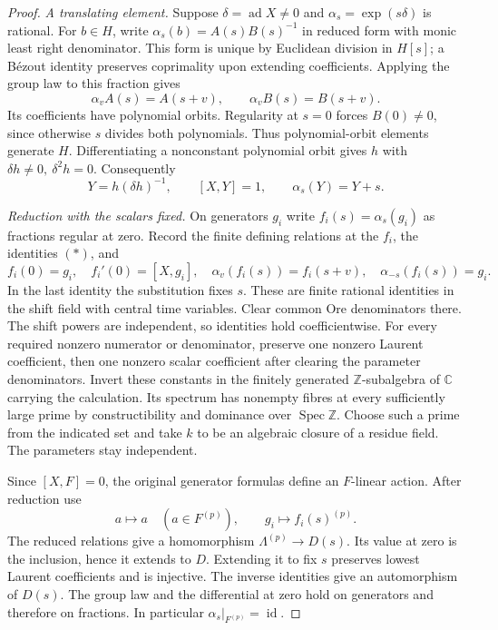 \documentclass[11pt,a4paper]{article}
\theoremstyle{definition}
\begin{document}
\begin{proof}
\emph{A translating element.}
Suppose \(\delta=\operatorname{ad}X\ne0\) and
\(\alpha_s=\exp(s\delta)\) is rational. For \(b\in H\), write
\(\alpha_s(b)=A(s)B(s)^{-1}\) in reduced form with monic least right
denominator. This form is unique by Euclidean division in \(H[s]\);
a Bézout identity preserves coprimality upon extending coefficients.
Applying the group law to this fraction gives
\[
 \alpha_v A(s)=A(s+v),\qquad \alpha_v B(s)=B(s+v).
\]
Its coefficients have polynomial orbits. Regularity at \(s=0\)
forces \(B(0)\ne0\), since otherwise \(s\) divides both polynomials.
Thus polynomial-orbit elements generate \(H\). Differentiating a
nonconstant polynomial orbit gives \(h\) with
\(\delta h\ne0,\ \delta^2h=0\). Consequently
\[
 Y=h(\delta h)^{-1},\qquad [X,Y]=1,\qquad \alpha_s(Y)=Y+s.
 \tag{*}
\]

\emph{Reduction with the scalars fixed.}
On generators \(g_i\) write \(f_i(s)=\alpha_s(g_i)\) as fractions
regular at zero. Record the finite defining relations at the \(f_i\),
the identities \((*)\), and
\[
 f_i(0)=g_i,\quad f_i'(0)=[X,g_i],\quad
 \alpha_v(f_i(s))=f_i(s+v),\quad
 \alpha_{-s}(f_i(s))=g_i.
\]
In the last identity the substitution fixes \(s\). These are finite
rational identities in the shift field with central time variables.
Clear common Ore denominators there. The shift powers are independent,
so identities hold coefficientwise. For every required nonzero
numerator or denominator, preserve one nonzero Laurent coefficient,
then one nonzero scalar coefficient after clearing the parameter
denominators. Invert these constants in the finitely generated
\(\mathbb Z\)-subalgebra of \(\mathbb C\) carrying the calculation.
Its spectrum has nonempty fibres at every sufficiently large prime
by constructibility and dominance over \(\operatorname{Spec}\mathbb Z\).
Choose such a prime from the indicated set and take \(k\) to be an
algebraic closure of a residue field. The parameters stay independent.

Since \([X,F]=0\), the original generator formulas define an
\(F\)-linear action. After reduction use
\[
 a\longmapsto a\quad(a\in F^{(p)}),\qquad
 g_i\longmapsto f_i(s)^{(p)} .
\]
The reduced relations give a homomorphism \(\Lambda^{(p)}\to D(s)\).
Its value at zero is the inclusion, hence it extends to \(D\).
Extending it to fix \(s\) preserves lowest Laurent coefficients and is
injective. The inverse identities give an automorphism of \(D(s)\).
The group law and the differential at zero hold on generators and
therefore on fractions. In particular \(\alpha_s|_{F^{(p)}}=\operatorname{id}\).


\end{proof}
\end{document}
